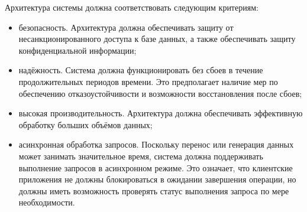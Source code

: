 Архитектура системы должна соответствовать следующим критериям:

\begin{itemize}
    \item безопасность. Архитектура должна обеспечивать защиту от несанкционированного доступа к базе данных, а также обеспечивать защиту конфиденциальной информации;
    \item надёжность. Система должна функционировать без сбоев в течение продолжительных периодов времени. Это предполагает наличие мер по обеспечению отказоустойчивости и возможности восстановления после сбоев;
    \item высокая производительность. Архитектура должна обеспечивать эффективную обработку больших объёмов данных;
    \item асинхронная обработка запросов. Поскольку перенос или генерация данных может занимать значительное время, система должна поддерживать выполнение запросов в асинхронном режиме. Это означает, что клиентские приложения не должны блокироваться в ожидании завершения операции, но должны иметь возможность проверять статус выполнения запроса по мере необходимости.
\end{itemize}
